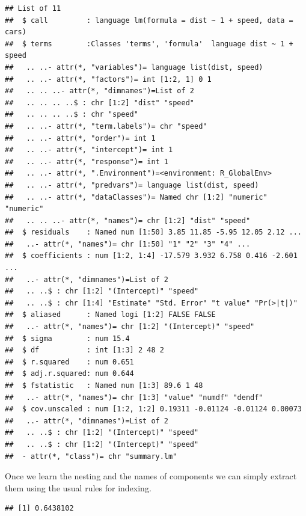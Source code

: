 \documentclass[krantz2]{krantz}\usepackage{knitr}%
\begin{document}
\begin{explainbox}
\begin{knitrout}\footnotesize
{}\color{fgcolor}\begin{kframe}
\begin{alltt}
\hlstd{(}
\end{alltt}
\begin{verbatim}
## List of 11
##  $ call         : language lm(formula = dist ~ 1 + speed, data = cars)
##  $ terms        :Classes 'terms', 'formula'  language dist ~ 1 + speed
##   .. ..- attr(*, "variables")= language list(dist, speed)
##   .. ..- attr(*, "factors")= int [1:2, 1] 0 1
##   .. .. ..- attr(*, "dimnames")=List of 2
##   .. .. .. ..$ : chr [1:2] "dist" "speed"
##   .. .. .. ..$ : chr "speed"
##   .. ..- attr(*, "term.labels")= chr "speed"
##   .. ..- attr(*, "order")= int 1
##   .. ..- attr(*, "intercept")= int 1
##   .. ..- attr(*, "response")= int 1
##   .. ..- attr(*, ".Environment")=<environment: R_GlobalEnv> 
##   .. ..- attr(*, "predvars")= language list(dist, speed)
##   .. ..- attr(*, "dataClasses")= Named chr [1:2] "numeric" "numeric"
##   .. .. ..- attr(*, "names")= chr [1:2] "dist" "speed"
##  $ residuals    : Named num [1:50] 3.85 11.85 -5.95 12.05 2.12 ...
##   ..- attr(*, "names")= chr [1:50] "1" "2" "3" "4" ...
##  $ coefficients : num [1:2, 1:4] -17.579 3.932 6.758 0.416 -2.601 ...
##   ..- attr(*, "dimnames")=List of 2
##   .. ..$ : chr [1:2] "(Intercept)" "speed"
##   .. ..$ : chr [1:4] "Estimate" "Std. Error" "t value" "Pr(>|t|)"
##  $ aliased      : Named logi [1:2] FALSE FALSE
##   ..- attr(*, "names")= chr [1:2] "(Intercept)" "speed"
##  $ sigma        : num 15.4
##  $ df           : int [1:3] 2 48 2
##  $ r.squared    : num 0.651
##  $ adj.r.squared: num 0.644
##  $ fstatistic   : Named num [1:3] 89.6 1 48
##   ..- attr(*, "names")= chr [1:3] "value" "numdf" "dendf"
##  $ cov.unscaled : num [1:2, 1:2] 0.19311 -0.01124 -0.01124 0.00073
##   ..- attr(*, "dimnames")=List of 2
##   .. ..$ : chr [1:2] "(Intercept)" "speed"
##   .. ..$ : chr [1:2] "(Intercept)" "speed"
##  - attr(*, "class")= chr "summary.lm"
\end{verbatim}
\end{kframe}
\end{knitrout}

Once we learn the nesting and the names of components we can simply extract them using the usual \Rlang rules for indexing.

\begin{knitrout}\footnotesize
{}\color{fgcolor}\begin{kframe}
\begin{alltt}
\hlopt{$}
\end{alltt}
\begin{verbatim}
## [1] 0.6438102
\end{verbatim}
\end{kframe}
\end{knitrout}


\end{explainbox}
\end{document}
